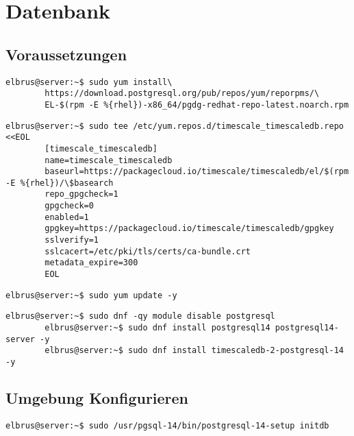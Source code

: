 \documentclass{article}
\begin{document}
	\newpage
	\section{Datenbank}
	\subsection[dependencies]{Voraussetzungen}
	\lstset{style=commands}
	\begin{lstlisting}[caption={Hinzufügen des PostgreSQL Drittanbieter-Repository, um die neuesten PostgreSQL-Pakete zu erhalten.}]
		elbrus@server:~$ sudo yum install\
		https://download.postgresql.org/pub/repos/yum/reporpms/\
		EL-$(rpm -E %{rhel})-x86_64/pgdg-redhat-repo-latest.noarch.rpm
	\end{lstlisting}

	\lstset{style=commands}
	\begin{lstlisting}[caption={Erstellen des Timescale repository.}]
		elbrus@server:~$ sudo tee /etc/yum.repos.d/timescale_timescaledb.repo <<EOL
		[timescale_timescaledb]
		name=timescale_timescaledb
		baseurl=https://packagecloud.io/timescale/timescaledb/el/$(rpm -E %{rhel})/\$basearch
		repo_gpgcheck=1
		gpgcheck=0
		enabled=1
		gpgkey=https://packagecloud.io/timescale/timescaledb/gpgkey
		sslverify=1
		sslcacert=/etc/pki/tls/certs/ca-bundle.crt
		metadata_expire=300
		EOL
	\end{lstlisting}

	\lstset{style=commands}
	\begin{lstlisting}[caption={Updaten der lokalen Package-Liste.}]
		elbrus@server:~$ sudo yum update -y
	\end{lstlisting}

	\begin{lstlisting}[caption={Installieren von TimescaleDB.}]
		elbrus@server:~$ sudo dnf -qy module disable postgresql
		elbrus@server:~$ sudo dnf install postgresql14 postgresql14-server -y
		elbrus@server:~$ sudo dnf install timescaledb-2-postgresql-14 -y
	\end{lstlisting}
	
	\newpage
	\subsection[TimescaleDB konfigurieren]{Umgebung Konfigurieren}
	\begin{lstlisting}[caption={Initialisieren der Datenbank.}]
		elbrus@server:~$ sudo /usr/pgsql-14/bin/postgresql-14-setup initdb
	\end{lstlisting}
	
\end{document}
